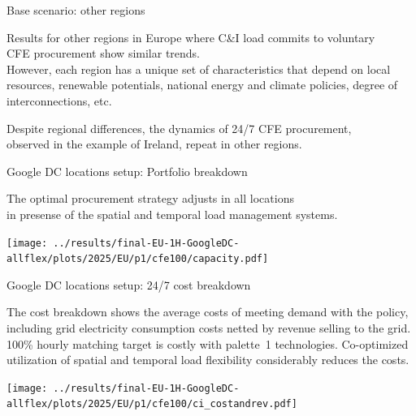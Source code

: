 \begin{frame}{Base scenario: other regions}
  \centering
  
  Results for other regions in Europe where C\&I load commits to voluntary  \\ 
  CFE procurement 
  show \alert{similar trends.} \\ 
  
  \vspace{0.3cm}
  However, each region has a \alert{unique set of characteristics} 
  that depend on local resources, renewable potentials,
  national energy and climate policies, degree of interconnections, etc.

  \vspace{0.3cm}
  Despite regional differences, the dynamics of 24/7 CFE procurement, \\
  observed in the example of Ireland, repeat in other regions.

\end{frame}



\begin{frame}{Google DC locations setup: Portfolio breakdown}

  \centering
  {\footnotesize
  The optimal procurement strategy adjusts in all locations \\ 
  in presense of the \alert{spatial} and \alert{temporal} load management systems. 
  }
  
\texttt{[image: ../results/final-EU-1H-GoogleDC-allflex/plots/2025/EU/p1/cfe100/capacity.pdf]}

\end{frame}


\begin{frame}{Google DC locations setup: 24/7 cost breakdown}

  \centering
  {\footnotesize
  The \alert{cost breakdown} shows the average costs of meeting demand with the policy, including grid electricity consumption costs netted by revenue selling to the grid.
  100\% hourly matching target is costly with palette~1 technologies. Co-optimized utilization of spatial and temporal load flexibility \alert{considerably reduces} the costs.
  }

\vspace{-0.2cm} 
\texttt{[image: ../results/final-EU-1H-GoogleDC-allflex/plots/2025/EU/p1/cfe100/ci\_costandrev.pdf]}

\end{frame}


